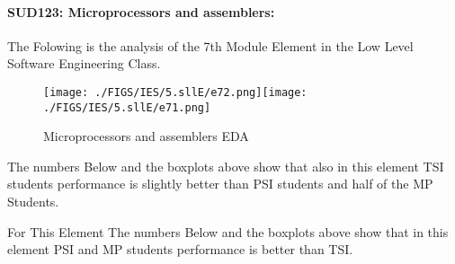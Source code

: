 \documentclass[12pt]{extreport}
\begin{document}

\paragraph{\large SUD123: Microprocessors and assemblers:\\
}  
The Folowing is the analysis of the 7th Module Element in the Low Level Software Engineering Class.
\begin{figure}[H]
	\centering
	\texttt{[image: ./FIGS/IES/5.sllE/e72.png]}\texttt{[image: ./FIGS/IES/5.sllE/e71.png]}
	\caption{ Microprocessors and assemblers EDA}
	\label{fig:67}
\end{figure}

The numbers Below and the boxplots above show that also in this element  TSI students performance is slightly better than PSI students and half of the MP Students.

For This Element The numbers Below and the boxplots above show that in this element  PSI and MP students performance is  better than TSI.


\begin{comment}
\subparagraph{Interpretation of the Box-plots:}
For This Element 
\begin{enumerate}	
	\item The MP Class Box-Plot:
	\begin{enumerate}
		\item MAX = a {} {} {} {} {} {} {} {} UQ = b {} {} {} {} {} {} {} {} Median = c
		\item LQ = d {} {} {} {} {} {} {} {}  MIN =	l {} {} {} {} {} {} {} {}  IQR = e - f = g
	\end{enumerate}
	\item The PSI Class Box-Plot:
	\begin{enumerate}
		\item MAX = a {} {} {} {} {} {} {} {} UQ = b {} {} {} {} {} {} {} {} Median = c
		\item LQ = d {} {} {} {} {} {} {} {}  MIN =	e {} {} {} {} {} {} {} {} IQR = f - g = h	
	\end{enumerate}
	\item The TSI Class Box-Plot:
	\begin{enumerate}
		\item MAX = a {} {} {} {} {} {} {} {} UQ = b {} {} {} {} {} {} {} {} Median = c
		\item LQ = d {} {} {} {} {} {} {} {} MIN = e {} {} {} {} {} {} {} {} IQR = f - g = h	
	\end{enumerate}
\end{enumerate}


\subparagraph{Interpretation of the histogram:}
This Frequency Distribution is (Skeness) with the following descriptive statistics:
\begin{enumerate}
	\item Mean = 
	\item STD = 
	\item Range = a - b = c
	\item IQR = a-b = c 
\end{enumerate}
\end{comment}
\end{document}
